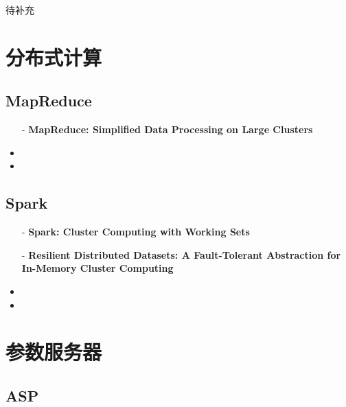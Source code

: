 \begin{newnote}
待补充 %
\end{newnote}


\section{分布式计算}\label{sec:papers:computing}


\subsection{MapReduce}\label{paper:mapreduce}

\begin{itemize}
	\item [-] \textbf{MapReduce: Simplified Data Processing on Large Clusters}
\end{itemize}

\begin{itemize}
	\item %
	\item 
\end{itemize}




\subsection{Spark}\label{paper:spark-and-rdd}

\begin{itemize}
	\item [-] \textbf{Spark: Cluster Computing with Working Sets}
	\item [-] \textbf{Resilient Distributed Datasets: A Fault-Tolerant Abstraction for In-Memory Cluster Computing}
\end{itemize}

\begin{itemize}
	\item %
	\item 
\end{itemize}



\section{参数服务器}\label{sec:papers:ps}

\subsection{ASP}\label{paper:asp}

